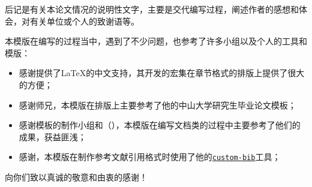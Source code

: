 \begin{acknowledgements}
    后记是有关本论文情况的说明性文字，主要是交代编写过程，阐述作者的感想和体会，对有关单位或个人的致谢语等。

    本模版在编写的过程当中，遇到了不少问题，也参考了许多小组以及个人的工具和模版：
    \begin{itemize}
        \item 感谢\href{https://github.com/CTeX-org/ctex-kit}{}提供了\LaTeX{}的中文支持，其开发的\href{https://ctan.org/tex-archive/language/chinese/ctex}{}宏集在章节格式的排版上提供了很大的方便；
        \item 感谢\href{https://www.zhihu.com/people/sgcd-33}{}师兄，本模版在排版上主要参考了他的中山大学研究生毕业论文模板\href{https://www.overleaf.com/latex/templates/zhong-shan-da-xue-yan-jiu-sheng-bi-ye-lun-wen-mo-ban-sysupalte/kybsnywqbcdc}{}；
        \item 感谢\href{https://github.com/sjtug/SJTUThesis}{}模板的制作小组和\href{https://github.com/nanmu42}{}（\href{https://github.com/nanmu42/CQUThesis}{}），本模版在编写文档类的过程中主要参考了他们的成果，获益匪浅；
        \item 感谢\href{https://www.ctan.org/author/daly}{}，本模版在制作参考文献引用格式时使用了他的\href{https://www.ctan.org/tex-archive/macros/latex/contrib/custom-bib/}{\texttt{custom-bib}}工具；
    \end{itemize}
    向你们致以真诚的敬意和由衷的感谢！
\end{acknowledgements}

